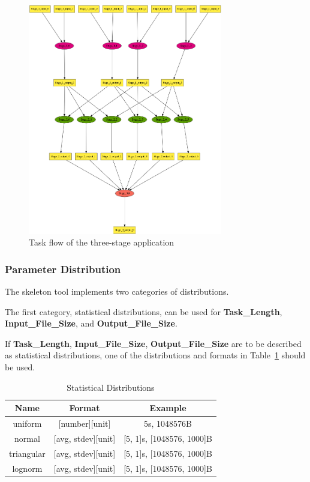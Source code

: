 \documentclass{sig-alternate}
\newcommand{\up}{\vspace*{-1em}}
\begin{document}
\begin{figure}[t]
   \includegraphics[width=85mm]{pictures/sample}
\caption {Task flow of the three-stage application
   \label{fig:sample}
}
\end{figure}


\subsubsection{Parameter Distribution}\label{sec:distr}
The skeleton tool implements two categories of distributions.

The first category, statistical distributions, can be used for \textbf{Task\_Length}, \textbf{Input\_File\_Size}, and \textbf{Output\_File\_Size}.

If \textbf{Task\_Length}, \textbf{Input\_File\_Size}, \textbf{Output\_File\_Size} are to be described as statistical distributions, one of the distributions and formats in Table~\ref{tb:distributions} should be used.

\begin{table}[h]
\begin{center}
\caption{Statistical Distributions}

\label{tb:distributions}
\vspace{4pt}
    \begin{scriptsize}
\begin{tabular}{|c|c|c|}
\hline
Name & Format & Example \\
\hline
\hline
uniform & [number][unit] & 5s, 1048576B\\
\hline
normal & [avg, stdev][unit] & [5, 1]s, [1048576, 1000]B\\
\hline
triangular &[avg, stdev][unit] & [5, 1]s, [1048576, 1000]B\\
\hline
lognorm & [avg, stdev][unit] & [5, 1]s, [1048576, 1000]B\\
\hline
\end{tabular}
    \end{scriptsize}
\up\up
\end{center}
\end{table}
\end{document}
